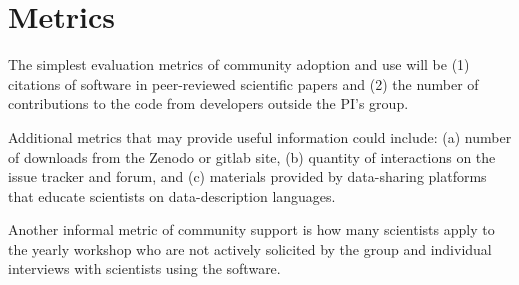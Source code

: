\section{Metrics}
The simplest evaluation metrics of community adoption and use will be (1) citations of software in peer-reviewed scientific papers and (2) the number of contributions to the code from developers outside the PI's group.

Additional metrics that may provide useful information could include: (a) number of downloads from the Zenodo or gitlab site, (b) quantity of interactions on the issue tracker and forum, and (c) materials provided by data-sharing platforms that educate scientists on data-description languages.

Another informal metric of community support is how many scientists apply to the yearly workshop who are not actively solicited by the group and individual interviews with scientists using the software.


